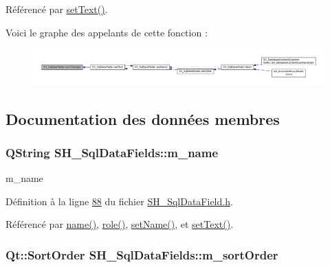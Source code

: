 Référencé par \hyperlink{classSH__SqlDataFields_a377b4964546e91bd344c8c6f5190a833}{set\-Text()}.



Voici le graphe des appelants de cette fonction \-:
\nopagebreak
\begin{figure}[H]
\begin{center}
\leavevmode
\includegraphics[width=350pt]{classSH__SqlDataFields_ae91d833d4b50bff27c87015179b1ac24_icgraph}
\end{center}
\end{figure}




\subsection{Documentation des données membres}
\hypertarget{classSH__SqlDataFields_a3c0e82a8b6652335bdc53b211d39d4e2}{
\subsubsection[{m\-\_\-name}]{\setlength{\rightskip}{0pt plus 5cm}Q\-String S\-H\-\_\-\-Sql\-Data\-Fields\-::m\-\_\-name\hspace{0.3cm}{\ttfamily [private]}}}\label{classSH__SqlDataFields_a3c0e82a8b6652335bdc53b211d39d4e2}


m\-\_\-name 



Définition à la ligne \hyperlink{SH__SqlDataField_8h_source_l00088}{88} du fichier \hyperlink{SH__SqlDataField_8h_source}{S\-H\-\_\-\-Sql\-Data\-Field.\-h}.



Référencé par \hyperlink{classSH__SqlDataFields_a4951291928ce837435411166d66a5a3f}{name()}, \hyperlink{classSH__SqlDataFields_a6e5a9b95f0249a85ccf2fd0844ab7170}{role()}, \hyperlink{classSH__SqlDataFields_ab658a817f459e5d0a8c0f5c4e8c28a9d}{set\-Name()}, et \hyperlink{classSH__SqlDataFields_a377b4964546e91bd344c8c6f5190a833}{set\-Text()}.

\hypertarget{classSH__SqlDataFields_aa5dbfa2beef7114fba275d61135a6760}{
\subsubsection[{m\-\_\-sort\-Order}]{\setlength{\rightskip}{0pt plus 5cm}Qt\-::\-Sort\-Order S\-H\-\_\-\-Sql\-Data\-Fields\-::m\-\_\-sort\-Order\hspace{0.3cm}{\ttfamily [private]}}}\label{classSH__SqlDataFields_aa5dbfa2beef7114fba275d61135a6760}


